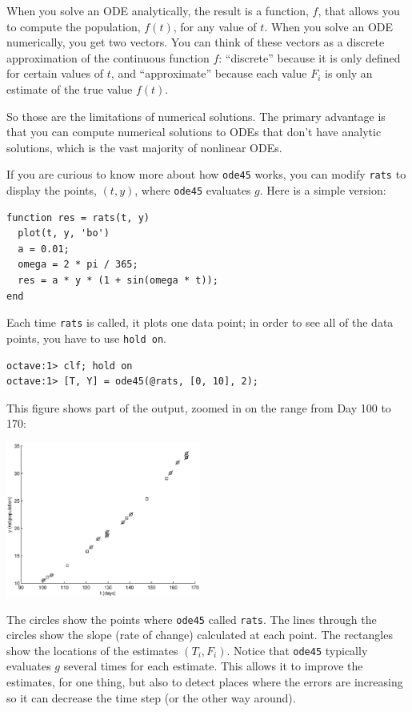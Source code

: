 When you solve an ODE analytically, the result is a function, $f$,
that allows you to compute the population, $f(t)$, for any value of
$t$. When you solve an ODE numerically, you get two vectors. You can
think of these vectors as a discrete approximation of the continuous
function $f$: ``discrete'' because it is only defined for certain
values of $t$, and ``approximate'' because each value $F_i$
is only an estimate of the true value $f(t)$.

So those are the limitations of numerical solutions. The primary
advantage is that you can compute numerical solutions to ODEs that
don't have analytic solutions, which is the vast majority
of nonlinear ODEs.

If you are curious to know more about how {\tt ode45} works, you
can modify {\tt rats} to display the points, $(t, y)$, where
{\tt ode45} evaluates $g$. Here is a simple version:

\begin{verbatim}
function res = rats(t, y)
  plot(t, y, 'bo')
  a = 0.01;
  omega = 2 * pi / 365;
  res = a * y * (1 + sin(omega * t));
end
\end{verbatim}

Each time {\tt rats} is called, it plots one data point; in order
to see all of the data points, you have to use {\tt hold on}.

\begin{verbatim}
octave:1> clf; hold on
octave:1> [T, Y] = ode45(@rats, [0, 10], 2);
\end{verbatim}

This figure shows part of the output, zoomed
in on the range from Day 100 to 170:

\beforefig \centerline{\includegraphics[height=2in]{figs/ode45.eps}}

The circles show the points where {\tt ode45} called {\tt rats}.
The lines through the circles show the slope (rate of change) calculated
at each point. The rectangles show the locations of the estimates
$(T_i, F_i)$. Notice that {\tt ode45} typically evaluates
$g$ several times for each estimate. This allows it to improve the
estimates, for one thing, but also to detect places where the errors
are increasing so it can decrease the time step (or the other
way around).


